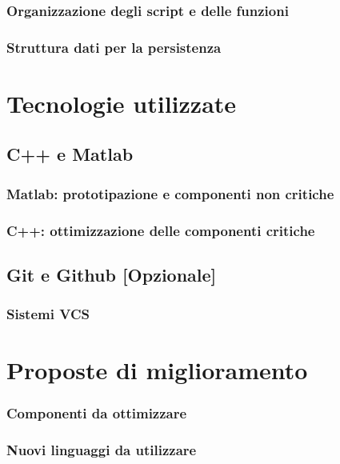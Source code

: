            \subsubsection{Organizzazione degli script e delle funzioni}
            \subsubsection{Struttura dati per la persistenza}
    \section{Tecnologie utilizzate}
        \subsection{C++ e Matlab}
            \subsubsection{Matlab: prototipazione e componenti non critiche}
            \subsubsection{C++: ottimizzazione delle componenti critiche}
        \subsection{Git e Github [Opzionale]}
            \subsubsection{Sistemi VCS}
    \section{Proposte di miglioramento}
        \subsubsection{Componenti da ottimizzare}
        \subsubsection{Nuovi linguaggi da utilizzare}